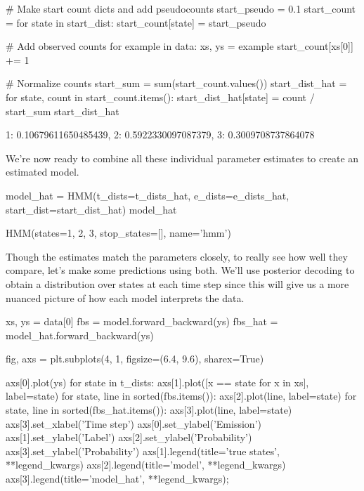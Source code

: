 \begin{NotebookIn}
# Make start count dicts and add pseudocounts
start_pseudo = 0.1
start_count = {}
for state in start_dist:
    start_count[state] = start_pseudo

# Add observed counts
for example in data:
    xs, ys = example
    start_count[xs[0]] += 1

# Normalize counts
start_sum = sum(start_count.values())
start_dist_hat = {}
for state, count in start_count.items():
    start_dist_hat[state] = count / start_sum
start_dist_hat
\end{NotebookIn}

\begin{NotebookOut}
{1: 0.10679611650485439, 2: 0.5922330097087379, 3: 0.3009708737864078}
\end{NotebookOut}

We're now ready to combine all these individual parameter estimates to create an estimated model.

\begin{NotebookIn}
model_hat = HMM(t_dists=t_dists_hat,
                e_dists=e_dists_hat,
                start_dist=start_dist_hat)
model_hat
\end{NotebookIn}

\begin{NotebookOut}
HMM(states={1, 2, 3},
    stop_states=[],
    name='hmm')
\end{NotebookOut}

Though the estimates match the parameters closely, to really see how well they compare, let's make some predictions using both. We'll use posterior decoding to obtain a distribution over states at each time step since this will give us a more nuanced picture of how each model interprets the data.

\begin{NotebookIn}
xs, ys = data[0]
fbs = model.forward_backward(ys)
fbs_hat = model_hat.forward_backward(ys)

fig, axs = plt.subplots(4, 1, figsize=(6.4, 9.6), sharex=True)

axs[0].plot(ys)
for state in t_dists:
    axs[1].plot([x == state for x in xs], label=state)
for state, line in sorted(fbs.items()):
    axs[2].plot(line, label=state)
for state, line in sorted(fbs_hat.items()):
    axs[3].plot(line, label=state)
axs[3].set_xlabel('Time step')
axs[0].set_ylabel('Emission')
axs[1].set_ylabel('Label')
axs[2].set_ylabel('Probability')
axs[3].set_ylabel('Probability')
axs[1].legend(title='true states', **legend_kwargs)
axs[2].legend(title='model', **legend_kwargs)
axs[3].legend(title='model_hat', **legend_kwargs);
\end{NotebookIn}

